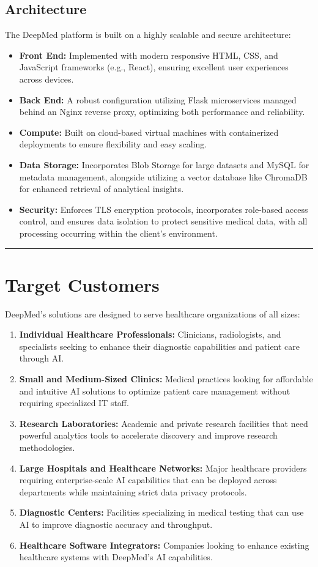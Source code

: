 \documentclass[11pt,a4paper]{article}
\begin{document}
\subsection{Architecture}
The DeepMed platform is built on a highly scalable and secure architecture:
\begin{itemize}
  \item \textbf{Front End:} Implemented with modern responsive HTML, CSS, and JavaScript frameworks (e.g., React), ensuring excellent user experiences across devices.
  \item \textbf{Back End:} A robust configuration utilizing Flask microservices managed behind an Nginx reverse proxy, optimizing both performance and reliability.
  \item \textbf{Compute:} Built on cloud-based virtual machines with containerized deployments to ensure flexibility and easy scaling.
  \item \textbf{Data Storage:} Incorporates Blob Storage for large datasets and MySQL for metadata management, alongside utilizing a vector database like ChromaDB for enhanced retrieval of analytical insights.
  \item \textbf{Security:} Enforces TLS encryption protocols, incorporates role-based access control, and ensures data isolation to protect sensitive medical data, with all processing occurring within the client's environment.
\end{itemize}

\bigskip\hrule\bigskip

\section{Target Customers}
DeepMed's solutions are designed to serve healthcare organizations of all sizes:
\begin{enumerate}
  \item \textbf{Individual Healthcare Professionals:} Clinicians, radiologists, and specialists seeking to enhance their diagnostic capabilities and patient care through AI.
  \item \textbf{Small and Medium-Sized Clinics:} Medical practices looking for affordable and intuitive AI solutions to optimize patient care management without requiring specialized IT staff.
  \item \textbf{Research Laboratories:} Academic and private research facilities that need powerful analytics tools to accelerate discovery and improve research methodologies.
  \item \textbf{Large Hospitals and Healthcare Networks:} Major healthcare providers requiring enterprise-scale AI capabilities that can be deployed across departments while maintaining strict data privacy protocols.
  \item \textbf{Diagnostic Centers:} Facilities specializing in medical testing that can use AI to improve diagnostic accuracy and throughput.
  \item \textbf{Healthcare Software Integrators:} Companies looking to enhance existing healthcare systems with DeepMed's AI capabilities.
\end{enumerate}
\end{document}

